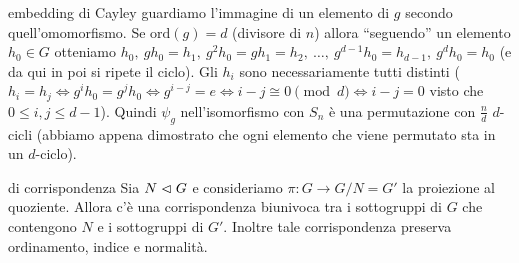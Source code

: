\begin{observation}{embedding di Cayley}
    guardiamo l'immagine di un elemento di $g$ secondo quell'omomorfismo. Se $\text{ord}(g) = d$ (divisore di $n$) allora ``seguendo'' un elemento $h_0 \in G$ otteniamo $h_0, \ gh_0=h_1, \ g^2h_0 = gh_1=h_2, \ \dots , \ g^{d-1}h_0 = h_{d-1}, \ g^dh_0 = h_0$ (e da qui in poi si ripete il ciclo). Gli $h_i$ sono necessariamente tutti distinti ($h_i = h_j \iff g^ih_0= g^jh_0 \iff g^{i-j} = e \iff i-j \cong 0 \pmod{d} \iff i-j = 0$ visto che $0 \leq i,j\leq d-1$).
    Quindi $\psi_g$ nell'isomorfismo con $S_n$ è una permutazione con $\frac{n}{d}$ $d$-cicli (abbiamo appena dimostrato che ogni elemento che viene permutato sta in un $d$-ciclo).
\end{observation}
\begin{theorem}{di corrispondenza}
    Sia $N \vartriangleleft G$ e consideriamo $\pi : G \rightarrow G/N = G'$ la proiezione al quoziente. Allora c'è una corrispondenza biunivoca tra i sottogruppi di $G$ che contengono $N$ e i sottogruppi di $G'$. Inoltre tale corrispondenza preserva ordinamento, indice e normalità. 
\end{theorem}
